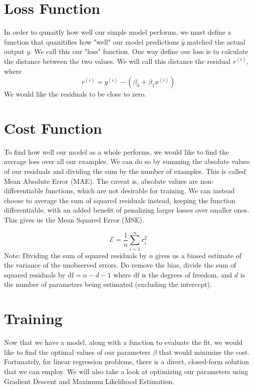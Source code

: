 \documentclass[../main.tex]{subfiles}
\begin{document}
\section{Loss Function}
In order to qunaitfy how well our simple model performs, we must define a function that quanitifies how "well" our model predictions \(\hat y\) matched the actual output \(y\). We call this our "loss" function. One way define our loss is to calculate the distance between the two values. We will call this distance the residual \(r^{(i)}\), where \[
	r^{(i)} = y^{(i)} - (\beta_0 + \beta_1 x^{(i)})
\]
We would like the residuals to be close to zero.

\section{Cost Function}
To find how well our model as a whole performs, we would like to find the average loss over all our examples. We can do so by summing the absolute values of our residuals and dividing the sum by the number of examples. This is called Mean Absolute Error (MAE). The caveat is, absolute values are non-differentiable functions, which are not desirable for training. We can instead choose to average the sum of squared residuals instead, keeping the function differentiable, with an added benefit of penalizing larger losses over smaller ones. This gives us the Mean Squared Error (MSE).

\[
	\boxed{\mathcal{E} = \frac{1}{n}\sum_{i=1}^nr_i^2}
\]
Note: Dividing the sum of squared residuals by \(n\) gives us a biased estimate of the variance of the unobserved errors. Do remove the bias, divide the sum of squared residuals by \(\mathrm{df} = n - d - 1\) where \(\mathrm{df}\) is the degrees of freedom, and \(d\) is the number of parameters being estimated (excluding the intercept).

\section{Training}
Now that we have a model, along with a function to evaluate the fit, we would like to find the optimal values of our parameters \(\beta\) that would minimize the cost. Fortunately, for linear regression problems, there is a direct, closed-form solution that we can employ. We will also take a look at optimizing our parameters using Gradient Descent and Maximum Likelihood Estimation.
\end{document}
